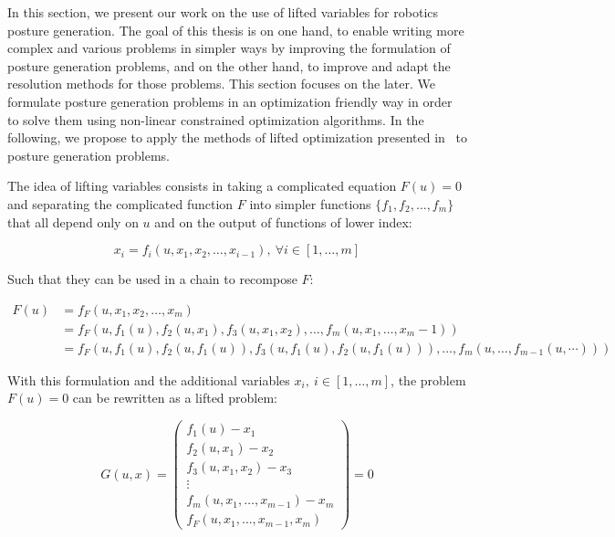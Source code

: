 In this section, we present our work on the use of lifted variables for robotics posture generation.
The goal of this thesis is on one hand, to enable writing more complex and various problems in simpler ways by improving the formulation of posture generation problems, and on the other hand, to improve and adapt the resolution methods for those problems.
This section focuses on the later.
We formulate posture generation problems in an optimization friendly way in order to solve them using non-linear constrained optimization algorithms.
In the following, we propose to apply the methods of lifted optimization presented in~\cite{Albersmeyer:2010:LNM:1958447.1958472} to posture generation problems.

The idea of lifting variables consists in taking a complicated equation $F(u) = 0$ and separating the complicated function $F$ into simpler functions $\{f_1, f_2, \ldots, f_m\}$ that all depend only on $u$ and on the output of functions of lower index:

\begin{equation}
  x_i = f_i(u, x_1, x_2, \ldots,x_{i-1}),\ \forall i\in[1,\ldots, m]
\end{equation}

Such that they can be used in a chain to recompose $F$:

\begin{align}
  F(u) &= f_F\left(u, x_1, x_2, \ldots, x_m\right)\\
       &= f_F\left(u, f_1(u), f_2(u,x_1), f_3(u,x_1,x_2), \ldots, f_m(u, x_1, \ldots, x_m-1)\right) \\
       &= f_F\left(u, f_1(u), f_2(u,f_1(u)), f_3(u,f_1(u),f_2(u,f_1(u))), \ldots, f_m(u, \ldots, f_{m-1}(u,\cdots))\right)
\end{align}

With this formulation and the additional variables $x_i,\ i\in[1,\ldots, m]$, the problem $F(u) = 0$ can be rewritten as a lifted problem:

\begin{equation}
  G(u,x) =
  \begin{pmatrix}
  f_1(u) - x_1 \\
  f_2(u,x_1) - x_2 \\
  f_3(u,x_1,x_2) - x_3 \\
  \vdots \\
  f_m(u,x_1,\ldots, x_{m-1}) - x_m \\
  f_F(u,x_1,\ldots, x_{m-1}, x_m)
  \end{pmatrix}
  =0
\end{equation}

